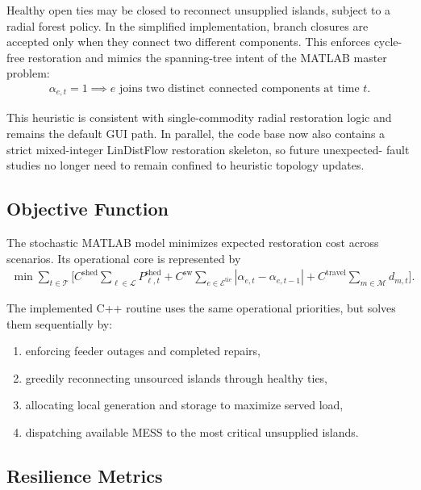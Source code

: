 Healthy open ties may be closed to reconnect unsupplied islands, subject to a
radial forest policy. In the simplified implementation, branch closures are
accepted only when they connect two different components. This enforces
cycle-free restoration and mimics the spanning-tree intent of the MATLAB master
problem:
\begin{align}
\alpha_{e,t} = 1
\implies e \text{ joins two distinct connected components at time } t.
\end{align}

This heuristic is consistent with single-commodity radial restoration logic and
remains the default GUI path. In parallel, the code base now also contains a
strict mixed-integer LinDistFlow restoration skeleton, so future unexpected-
fault studies no longer need to remain confined to heuristic topology updates.

\subsection{Objective Function}

The stochastic MATLAB model minimizes expected restoration cost across
scenarios. Its operational core is represented by
\begin{align}
\min \sum_{t\in\mathcal{T}} \Bigg[
C^{\mathrm{shed}} \sum_{\ell\in\mathcal{L}} P^{\mathrm{shed}}_{\ell,t}
+ C^{\mathrm{sw}} \sum_{e\in\mathcal{E}^{\mathrm{tie}}}
\left|\alpha_{e,t} - \alpha_{e,t-1}\right|
+ C^{\mathrm{travel}} \sum_{m\in\mathcal{M}} d_{m,t}
\Bigg].
\end{align}

The implemented C++ routine uses the same operational priorities, but solves
them sequentially by:
\begin{enumerate}
  \item enforcing feeder outages and completed repairs,
  \item greedily reconnecting unsourced islands through healthy ties,
  \item allocating local generation and storage to maximize served load,
  \item dispatching available MESS to the most critical unsupplied islands.
\end{enumerate}

\subsection{Resilience Metrics}

